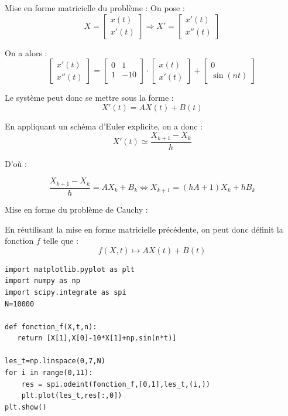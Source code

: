 \documentclass[10pt,fleqn]{article} %
\begin{document}
\begin{corrige}
Mise en forme matricielle du problème : 
On pose : 
$$
X = \left[
\begin{array}{c}
x(t) \\
x'(t)
\end{array}
\right]
\Rightarrow
X' = \left[
\begin{array}{c}
x'(t) \\
x''(t)
\end{array}
\right]
$$

On a alors : $$
\left[
\begin{array}{c}
x'(t) \\
x''(t)
\end{array}
\right]
=
 \left[
\begin{array}{cc}
0 & 1 \\
 1 &- 10\\
\end{array}
\right]
\cdot
 \left[
\begin{array}{c}
x(t) \\
x'(t)
\end{array}
\right]
+
\left[
\begin{array}{c}
0 \\
\sin (nt)
\end{array}
\right]
$$

Le système peut donc se mettre sous la forme : 
$$
X'(t) = AX(t)+ B(t)
$$

En appliquant un schéma d'Euler explicite, on a donc :
$$
X'(t) \simeq \dfrac{X_{k+1}-X_{k}}{h}
$$ 

D'où :

$$
\dfrac{X_{k+1}-X_{k}}{h} = AX_k + B_k 
\Leftrightarrow 
X_{k+1} = (hA +1) X_k + hB_k
$$
\end{corrige}



\begin{corrige}
Mise en forme du problème de Cauchy : 

En réutilisant la mise en forme matricielle précédente, on peut donc définit la fonction $f$ telle que : 
$$
f(X,t) \mapsto  AX(t) + B(t)
$$


\begin{lstlisting}
import matplotlib.pyplot as plt
import numpy as np
import scipy.integrate as spi
N=10000

def fonction_f(X,t,n):
   return [X[1],X[0]-10*X[1]+np.sin(n*t)]

les_t=np.linspace(0,7,N)
for i in range(0,11):
    res = spi.odeint(fonction_f,[0,1],les_t,(i,))
    plt.plot(les_t,res[:,0])
plt.show()
\end{lstlisting}
\end{corrige}
\end{document}
